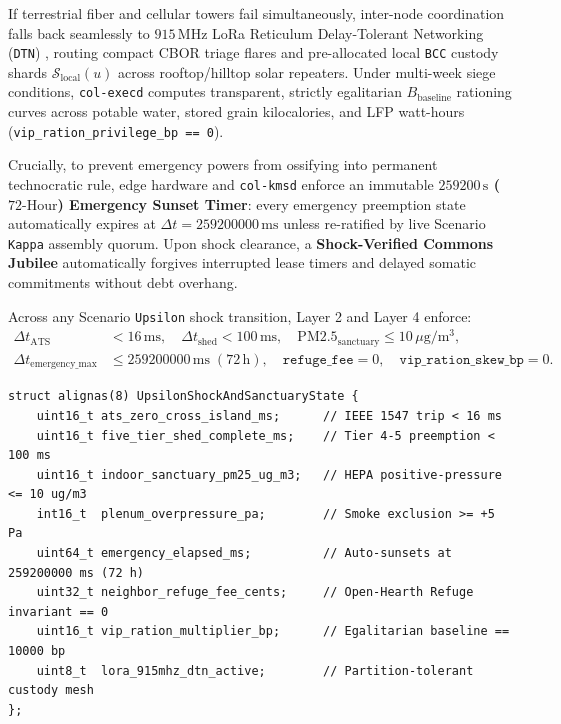 If terrestrial fiber and cellular towers fail simultaneously, inter-node coordination falls back seamlessly to $915\,\mathrm{MHz}$ LoRa Reticulum
Delay-Tolerant Networking (\texttt{DTN}) \parencite{fall2003}, routing compact CBOR triage flares and pre-allocated local \texttt{BCC} custody shards
$\mathcal{S}_{\mathrm{local}}(u)$ across rooftop/hilltop solar repeaters. Under multi-week siege conditions, \texttt{col-execd} computes transparent,
strictly egalitarian $B_{\mathrm{baseline}}$ rationing curves across potable water, stored grain kilocalories, and LFP watt-hours
(\texttt{vip\_ration\_privilege\_bp == 0}).

Crucially, to prevent emergency powers from ossifying into permanent technocratic rule, edge hardware and \texttt{col-kmsd} enforce an immutable
\textbf{$259200\,\mathrm{s}$ ($72\text{-Hour}$) Emergency Sunset Timer}: every emergency preemption state automatically expires at
$\Delta t = 259200000\,\mathrm{ms}$ unless re-ratified by live Scenario \texttt{Kappa} assembly quorum. Upon shock clearance, a \textbf{Shock-Verified
Commons Jubilee} automatically forgives interrupted lease timers and delayed somatic commitments without debt overhang.

\begin{invariant}
\label{inv:upsilon-shock}
Across any Scenario \texttt{Upsilon} shock transition, Layer 2 and Layer 4 enforce:
\begin{align}
\Delta t_{\mathrm{ATS}} &< 16\,\mathrm{ms}, \quad \Delta t_{\mathrm{shed}} < 100\,\mathrm{ms}, \quad \mathrm{PM2.5}_{\mathrm{sanctuary}} \le 10\,\mu\mathrm{g/m^3}, \\
\Delta t_{\mathrm{emergency\_max}} &\le 259200000\,\mathrm{ms}\;(72\,\mathrm{h}), \quad \mathtt{refuge\_fee} = 0, \quad \mathtt{vip\_ration\_skew\_bp} = 0.
\end{align}
\end{invariant}

\begin{lstlisting}[caption={Scenario \texttt{Upsilon} IEEE 1547 Islanding, Smoke Refuge, and $72\text{-Hour}$ Hardware Sunset Structs},label={lst:upsilon-structs}]
struct alignas(8) UpsilonShockAndSanctuaryState {
    uint16_t ats_zero_cross_island_ms;      // IEEE 1547 trip < 16 ms
    uint16_t five_tier_shed_complete_ms;    // Tier 4-5 preemption < 100 ms
    uint16_t indoor_sanctuary_pm25_ug_m3;   // HEPA positive-pressure <= 10 ug/m3
    int16_t  plenum_overpressure_pa;        // Smoke exclusion >= +5 Pa
    uint64_t emergency_elapsed_ms;          // Auto-sunsets at 259200000 ms (72 h)
    uint32_t neighbor_refuge_fee_cents;     // Open-Hearth Refuge invariant == 0
    uint16_t vip_ration_multiplier_bp;      // Egalitarian baseline == 10000 bp
    uint8_t  lora_915mhz_dtn_active;        // Partition-tolerant custody mesh
};
\end{lstlisting}

